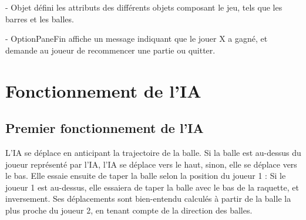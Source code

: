 \documentclass{report}
\begin{document}
- Objet défini les attributs des différents objets composant le jeu, tels que les barres et les balles.

- OptionPaneFin affiche un message indiquant que le jouer X a gagné, et demande au joueur de recommencer une partie ou quitter.

\chapter{Fonctionnement de l'IA}
\section{Premier fonctionnement de l'IA}
L'IA se déplace en anticipant la trajectoire de la balle. Si la balle est au-dessus du joueur représenté par l'IA, l'IA se déplace vers le haut, sinon, elle se déplace vers le bas. Elle essaie ensuite de taper la balle selon la position du joueur 1 : Si le joueur 1 est au-dessus, elle essaiera de taper la balle avec le bas de la raquette, et inversement. Ses déplacements sont bien-entendu calculés à partir de la balle la plus proche du joueur 2, en tenant compte de la direction des balles.
\end{document}
